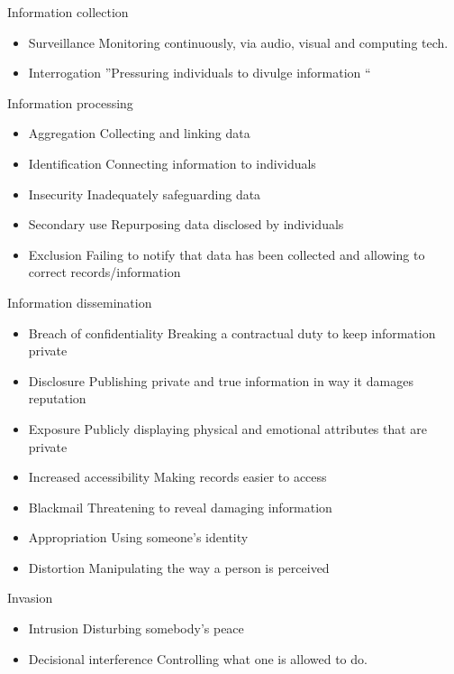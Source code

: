 \documentclass{article}
\begin{document}
\begin{flushleft}
Information collection
\begin{itemize}
  \item Surveillance Monitoring continuously, via audio, visual and computing tech.
  \item Interrogation ”Pressuring individuals to divulge information “
\end{itemize}
Information processing
\begin{itemize}
  \item Aggregation Collecting and linking data
  \item Identification Connecting information to individuals
  \item Insecurity Inadequately safeguarding data
  \item Secondary use Repurposing data disclosed by individuals
  \item Exclusion Failing to notify that data has been collected and allowing to correct records/information
\end{itemize}
Information dissemination
\begin{itemize}
  \item Breach of confidentiality Breaking a contractual duty to keep information private
  \item Disclosure Publishing private and true information in way it damages reputation
  \item Exposure Publicly displaying physical and emotional attributes that are private
  \item Increased accessibility Making records easier to access
  \item Blackmail Threatening to reveal damaging information
  \item Appropriation Using someone’s identity
  \item Distortion Manipulating the way a person is perceived
\end{itemize}
Invasion
\begin{itemize}
  \item Intrusion Disturbing somebody’s peace
  \item Decisional interference Controlling what one is allowed to do.
\end{itemize}
\end{flushleft}
\end{document}
